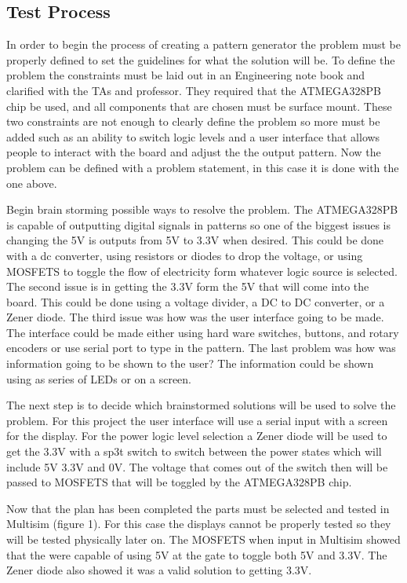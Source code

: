 \documentclass[12pt]{article}
\begin{document}
        \subsection{Test Process}
        In order to begin the process of creating a pattern generator the problem must be properly defined to set the guidelines for what the solution will be. To define the problem the constraints must be laid out in an Engineering note book and clarified with the TAs and professor. They required that the ATMEGA328PB chip be used, and all components that are chosen must be surface mount. These two constraints are not enough to clearly define the problem so more must be added such as an ability to switch logic levels and a user interface that allows people to interact with the board and adjust the the output pattern. Now the problem can be defined with a problem statement, in this case it is done with the one above.
        \par Begin brain storming possible ways to resolve the problem. The ATMEGA328PB is capable of outputting digital signals in patterns so one of the biggest issues is changing the 5V is outputs from 5V to 3.3V when desired. This could be done with a dc converter, using resistors or diodes to drop the voltage, or using MOSFETS to toggle the flow of electricity form whatever logic source is selected. The second issue is in getting the 3.3V form the 5V that will come into the board. This could be done using a voltage divider, a DC to DC converter, or a Zener diode. The third issue was how was the user interface going to be made. The interface could be made either using hard ware switches, buttons, and rotary encoders or use serial port to type in the pattern. The last problem was how was information going to be shown to the user? The information could be shown using as series of LEDs or on a screen.
        \par The next step is to decide which brainstormed solutions will be used to solve the problem. For this project the user interface will use a serial input with a screen for the display. For the power logic level selection a Zener diode will be used to get the 3.3V with a sp3t switch to switch between the power states which will include 5V 3.3V and 0V. The voltage that comes out of the switch then will be passed to MOSFETS that will be toggled by the ATMEGA328PB chip.
        \par Now that the plan has been completed the parts must be selected and tested in Multisim (figure 1). For this case the displays cannot be properly tested so they will be tested physically later on. The MOSFETS when input in Multisim showed that the were capable of using 5V at the gate to toggle both 5V and 3.3V. The Zener diode also showed it was a valid solution to getting 3.3V.
\end{document}
